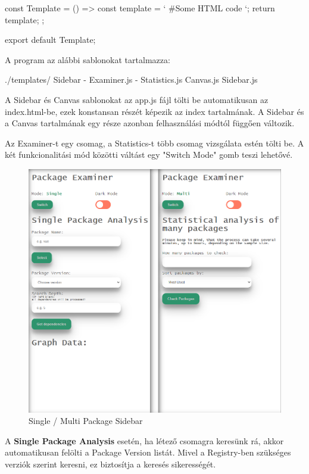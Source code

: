 \begin{js}
	const Template = () => {
		const template = `
		#Some HTML code
		`;
		return template;
	};

	export default Template;
\end{js}

A program az alábbi sablonokat tartalmazza:
\begin{js}
./templates/	
	Sidebar
	- Examiner.js
	- Statistics.js
	Canvas.js
	Sidebar.js
\end{js}

A Sidebar és Canvas sablonokat az app.js fájl tölti be automatikusan az index.html-be, ezek konstansan részét képezik az index tartalmának. A Sidebar és a Canvas tartalmának egy része azonban felhasználási módtól függően változik.

Az Examiner-t egy csomag, a Statistics-t több csomag vizsgálata estén tölti be. A két funkcionalitási mód közötti váltást egy "Switch Mode" gomb teszi lehetővé.\\

\begin{figure}[!h]
	\centering
	\includegraphics[scale=0.2]{images/ui_modes.png}
	\caption{Single / Multi Package Sidebar}
	\label{fig:ui_modes}
\end{figure}

\pagebreak


A \textbf{Single Package Analysis} esetén, ha létező csomagra keresünk rá, akkor automatikusan felölti a Package Version listát. Mivel a Registry-ben szükséges verziók szerint keresni, ez biztosítja a keresés sikerességét.\\

